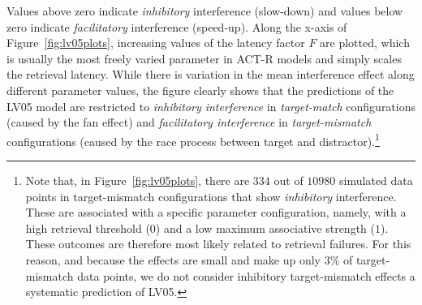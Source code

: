 \documentclass{cambridge7A}\usepackage[]{graphicx}\usepackage[]{color}
\newcommand{\revisedII}[1]{#1}
\begin{document}
Values above zero indicate \emph{inhibitory} interference (slow-down) and values below zero indicate \emph{facilitatory} interference (speed-up). 
Along the x-axis of Figure~\ref{fig:lv05plots}, increasing values of the latency factor $F$ are plotted, which is usually the most freely varied parameter in ACT-R models and simply scales the retrieval latency. 
While there is variation in the mean interference effect along different parameter values, the figure clearly shows that the predictions of the LV05 model are restricted to \emph{inhibitory interference} in \emph{target-match} configurations (caused by the fan effect) and \emph{facilitatory interference} in \emph{target-mismatch} configurations (caused by the race process between target and distractor).\footnote{
\revisedII{
	Note that, in Figure~\ref{fig:lv05plots}, there are $334$ out of $10980$ simulated data points in target-mismatch configurations that show \textit{inhibitory} interference. These are associated with a specific parameter configuration, namely, with a high retrieval threshold ($0$) and a low maximum associative strength ($1$). These outcomes are therefore most likely related to retrieval failures. For this reason, and because the effects are small and make up only $3\%$ of target-mismatch data points, we do not consider inhibitory target-mismatch effects a systematic prediction of LV05.
}
}


\end{document}
